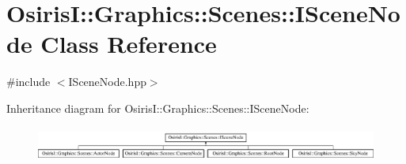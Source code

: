 \hypertarget{class_osiris_i_1_1_graphics_1_1_scenes_1_1_i_scene_node}{\section{Osiris\-I\-:\-:Graphics\-:\-:Scenes\-:\-:I\-Scene\-Node Class Reference}
\label{class_osiris_i_1_1_graphics_1_1_scenes_1_1_i_scene_node}
}


{\ttfamily \#include $<$I\-Scene\-Node.\-hpp$>$}

Inheritance diagram for Osiris\-I\-:\-:Graphics\-:\-:Scenes\-:\-:I\-Scene\-Node\-:\begin{figure}[H]
\begin{center}
\leavevmode
\includegraphics[height=1.161826cm]{class_osiris_i_1_1_graphics_1_1_scenes_1_1_i_scene_node}
\end{center}
\end{figure}
